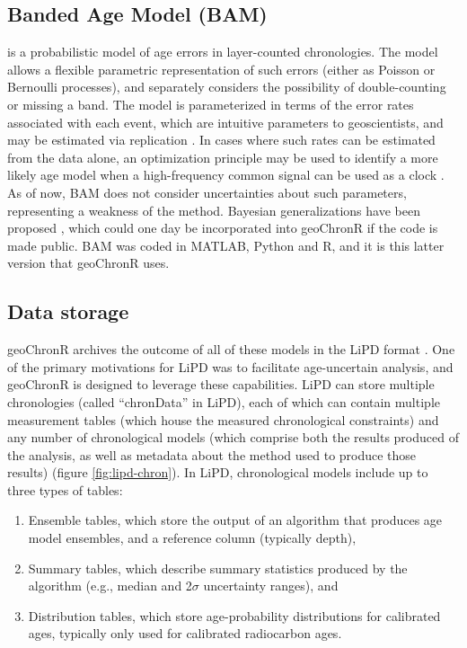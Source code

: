 \documentclass[gchron, manuscript]{copernicus}
\begin{document}
\subsection{Banded Age Model (BAM)}

\citet{BAM} is a probabilistic model of age errors in layer-counted chronologies.
The model allows a flexible parametric representation of such errors (either as Poisson or Bernoulli processes), and separately considers the possibility of double-counting or missing a band.
The model is parameterized in terms of the error rates associated with each event, which are intuitive parameters to geoscientists, and may be estimated via replication \citep{DeLong_Paleo3_2013}.
In cases where such rates can be estimated from the data alone, an optimization principle may be used to identify a more likely age model when a high-frequency common signal can be used as a clock \citep{BAM}.
As of now, BAM does not consider uncertainties about such parameters, representing a weakness of the method.
Bayesian generalizations have been proposed \citep{BoersCP2017}, which could one day be incorporated into geoChronR if the code is made public.
BAM was coded in MATLAB, Python and R, and it is this latter version that geoChronR uses.

\hypertarget{sec:storage}{%
\subsection{Data storage}\label{sec:storage}}

geoChronR archives the outcome of all of these models in the LiPD format \citep{lipd_cp}.
One of the primary motivations for LiPD was to facilitate age-uncertain analysis, and geoChronR is designed to leverage these capabilities.
LiPD can store multiple chronologies (called ``chronData'' in LiPD), each of which can contain multiple measurement tables (which house the measured chronological constraints) and any number of chronological models (which comprise both the results produced of the analysis, as well as metadata about the method used to produce those results) (figure \ref{fig:lipd-chron}).
In LiPD, chronological models include up to three types of tables:

\begin{enumerate}
\def\labelenumi{\arabic{enumi}.}
\item
  Ensemble tables, which store the output of an algorithm that produces age model ensembles, and a reference column (typically depth),
\item
  Summary tables, which describe summary statistics produced by the algorithm (e.g., median and 2\(\sigma\) uncertainty ranges), and
\item
  Distribution tables, which store age-probability distributions for calibrated ages, typically only used for calibrated radiocarbon ages.
\end{enumerate}
\end{document}
